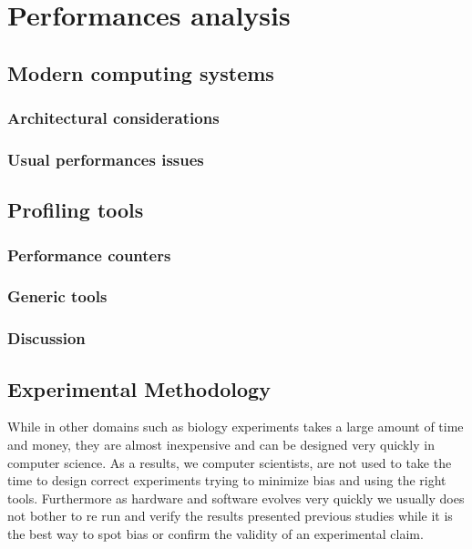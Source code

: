 \chapter{Performances analysis}

\section{Modern computing systems}

\subsection{Architectural considerations}


\subsection{Usual performances issues}



\section{Profiling tools}


\subsection{Performance counters}


\subsection{Generic tools}


\subsection{Discussion}

\section{Experimental Methodology}

While in other domains such as biology experiments takes a large amount of
time and money, they are almost inexpensive and can be designed very quickly
in computer science. As a results, we computer scientists, are not used to
take the time to design correct experiments trying to minimize bias and using
the right tools. Furthermore as hardware and software evolves very quickly we
usually does not bother to re run and verify the results presented previous
studies while it is the best way to spot bias or confirm the validity of an
experimental claim.

